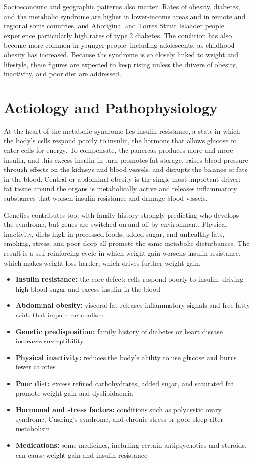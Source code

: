 Socioeconomic and geographic patterns also matter. Rates of obesity, diabetes, and the metabolic syndrome are higher in lower-income areas and in remote and regional some countries, and Aboriginal and Torres Strait Islander people experience particularly high rates of type 2 diabetes. The condition has also become more common in younger people, including adolescents, as childhood obesity has increased. Because the syndrome is so closely linked to weight and lifestyle, these figures are expected to keep rising unless the drivers of obesity, inactivity, and poor diet are addressed.

\section*{Aetiology and Pathophysiology}
At the heart of the metabolic syndrome lies insulin resistance, a state in which the body's cells respond poorly to insulin, the hormone that allows glucose to enter cells for energy. To compensate, the pancreas produces more and more insulin, and this excess insulin in turn promotes fat storage, raises blood pressure through effects on the kidneys and blood vessels, and disrupts the balance of fats in the blood. Central or abdominal obesity is the single most important driver: fat tissue around the organs is metabolically active and releases inflammatory substances that worsen insulin resistance and damage blood vessels.

Genetics contributes too, with family history strongly predicting who develops the syndrome, but genes are switched on and off by environment. Physical inactivity, diets high in processed foods, added sugar, and unhealthy fats, smoking, stress, and poor sleep all promote the same metabolic disturbances. The result is a self-reinforcing cycle in which weight gain worsens insulin resistance, which makes weight loss harder, which drives further weight gain.

\begin{itemize}
    \item \textbf{Insulin resistance:} the core defect; cells respond poorly to insulin, driving high blood sugar and excess insulin in the blood
    \item \textbf{Abdominal obesity:} visceral fat releases inflammatory signals and free fatty acids that impair metabolism
    \item \textbf{Genetic predisposition:} family history of diabetes or heart disease increases susceptibility
    \item \textbf{Physical inactivity:} reduces the body's ability to use glucose and burns fewer calories
    \item \textbf{Poor diet:} excess refined carbohydrates, added sugar, and saturated fat promote weight gain and dyslipidaemia
    \item \textbf{Hormonal and stress factors:} conditions such as polycystic ovary syndrome, Cushing's syndrome, and chronic stress or poor sleep alter metabolism
    \item \textbf{Medications:} some medicines, including certain antipsychotics and steroids, can cause weight gain and insulin resistance
\end{itemize}

